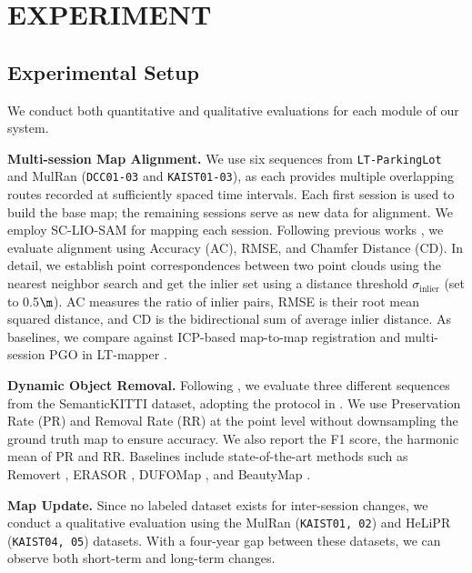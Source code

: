 \section{EXPERIMENT}
\label{sec:experiment}

\subsection{Experimental Setup}
We conduct both quantitative and qualitative evaluations for each module of our system.

\textbf{Multi-session Map Alignment.}
We use six sequences from \texttt{LT-ParkingLot} \cite{kim2022lt} and MulRan \cite{kim2020mulran} (\texttt{DCC01-03} and \texttt{KAIST01-03}), as each provides multiple overlapping routes recorded at sufficiently spaced time intervals. Each first session is used to build the base map; the remaining sessions serve as new data for alignment. We employ SC-LIO-SAM \cite{shan2020lio, kim2021scan} for mapping each session.  
Following previous works \cite{hu2024paloc, yang2024lifelong}, we evaluate alignment using Accuracy (AC), RMSE, and Chamfer Distance (CD). 
In detail, we establish point correspondences between two point clouds using the nearest neighbor search and get the inlier set using a distance threshold $\sigma_{\text{inlier}}$ (set to 0.5$\m$).
AC measures the ratio of inlier pairs, RMSE is their root mean squared distance, and CD is the bidirectional sum of average inlier distance.
As baselines, we compare against ICP-based map-to-map registration \cite{girardeau2016cloudcompare} and multi-session PGO in LT-mapper \cite{kim2022lt}.

\textbf{Dynamic Object Removal.} 
Following \cite{lim2021erasor, jia2024beautymap, duberg2024dufomap}, we evaluate three different sequences from the SemanticKITTI \cite{behley2019semantickitti} dataset, adopting the protocol in \cite{zhang2023dynamic}. We use Preservation Rate (PR) and Removal Rate (RR) \cite{lim2021erasor} at the point level without downsampling the ground truth map to ensure accuracy. We also report the F1 score, the harmonic mean of PR and RR.  
Baselines include state-of-the-art methods such as Removert \cite{kim2020remove}, ERASOR \cite{lim2021erasor}, DUFOMap \cite{duberg2024dufomap}, and BeautyMap \cite{jia2024beautymap}.

\textbf{Map Update.}
Since no labeled dataset exists for inter-session changes, we conduct a qualitative evaluation using the MulRan \cite{kim2020mulran} (\texttt{KAIST01, 02}) and HeLiPR \cite{jung2023helipr} (\texttt{KAIST04, 05}) datasets. With a four-year gap between these datasets, we can observe both short-term and long-term changes.

